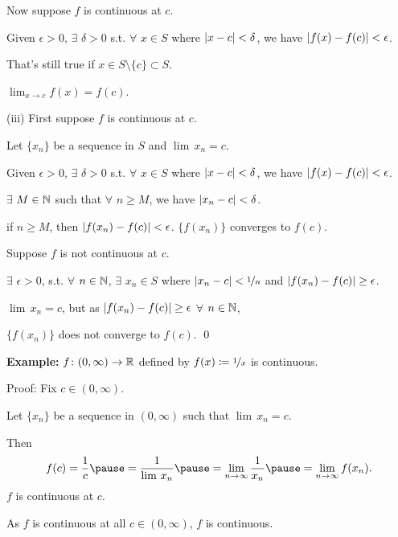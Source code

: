 \documentclass[10pt,aspectratio=149]{beamer}
\begin{document}
\begin{frame}
Now suppose $f$ is continuous at $c$.

\pause
Given $\epsilon > 0$, $\exists$ $\delta > 0$
s.t. $\forall$ $x \in S$ where $\left\lvert {x-c} \right\rvert < \delta$, we have
$\left\lvert {f(x)-f(c)} \right\rvert < \epsilon$.

\pause
That's still true if $x \in S \setminus \{ c \} \subset S$.

\pause
\thus \quad $\lim_{x\to c} f(x) = f(c)$.

\pause
\medskip

(iii)
First suppose $f$ is continuous at $c$.

\pause
Let $\{ x_n \}$ be a sequence in $S$ and $\lim\, x_n = c$.

\pause
Given $\epsilon > 0$, $\exists$ $\delta > 0$ s.t.
$\forall$ $x \in S$ where $\left\lvert {x-c} \right\rvert < \delta$, we have
$\left\lvert {f(x)-f(c)} \right\rvert < \epsilon$.

\pause
$\exists$ $M \in {\mathbb{N}}$
such that $\forall$ $n \geq M$, we have $\left\lvert {x_n-c} \right\rvert < \delta$.

\pause
\thus \quad if
$n \geq M$, then $\left\lvert {f(x_n)-f(c)} \right\rvert < \epsilon$.
\pause
\wthus $\bigl\{ f(x_n) \bigr\}$ converges to $f(c)$.

\pause
\medskip

Suppose $f$ is not continuous at $c$.

\pause
$\exists$ $\epsilon > 0$,
s.t. $\forall$ $n \in {\mathbb{N}}$,
$\exists$ $x_n \in S$
where
$\left\lvert {x_n-c} \right\rvert < \nicefrac{1}{n}$ and
$\left\lvert {f(x_n)-f(c)} \right\rvert \geq \epsilon$.

\pause
$\lim\, x_n = c$,
\quad
but as $\left\lvert {f(x_n)-f(c)} \right\rvert \geq \epsilon$ $\forall$ $n \in {\mathbb{N}}$,

\pause
\thus \quad $\{ f(x_n) \}$
does not converge to $f(c)$.
\qed

\end{frame}

\begin{frame}

\textbf{Example:}
$f \colon (0,\infty) \to {\mathbb{R}}$ defined by
$f(x) \coloneqq \nicefrac{1}{x}$ is continuous.

\pause
\medskip

Proof: Fix $c \in (0,\infty)$.  

\pause
Let $\{ x_n \}$ be a sequence in $(0,\infty)$ such that
$\lim\, x_n = c$.

\pause
Then
\[
f(c) = \frac{1}{c}
\pause
=
\frac{1}{\lim\, x_n}
\pause
=
\lim_{n \to \infty} \frac{1}{x_n}
\pause
=
\lim_{n \to \infty} f(x_n) .
\]
\pause
\thus \quad $f$ is continuous at $c$.

\pause
\medskip

As $f$ is continuous at all $c \in (0,\infty)$, $f$ is continuous.

\end{frame}
\end{document}
